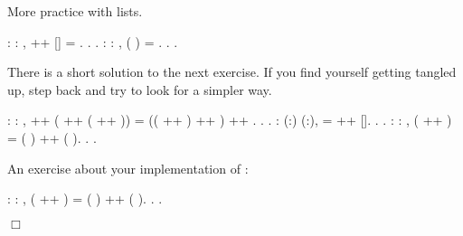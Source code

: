 \documentclass[12pt]{report}
\begin{document}
 More practice with lists. \begin{coqdoccode}
\coqdocemptyline
\coqdocnoindent
{}  : \coqdockw{\ensuremath{\forall}}  : , \coqdoceol
\coqdocindent{1.00em}
 ++ [] = .\coqdoceol
\coqdocnoindent
{}.\coqdoceol
 .\coqdoceol
\coqdocemptyline
\coqdocnoindent
{}  : \coqdockw{\ensuremath{\forall}}  : ,\coqdoceol
\coqdocindent{1.00em}
 ( ) = .\coqdoceol
\coqdocnoindent
{}.\coqdoceol
 .\coqdoceol
\coqdocemptyline
\end{coqdoccode}
There is a short solution to the next exercise.  If you find
    yourself getting tangled up, step back and try to look for a
    simpler way. \begin{coqdoccode}
\coqdocemptyline
\coqdocnoindent
{}  : \coqdockw{\ensuremath{\forall}}     : ,\coqdoceol
\coqdocindent{1.00em}
 ++ ( ++ ( ++ )) = (( ++ ) ++ ) ++ .\coqdoceol
\coqdocnoindent
{}.\coqdoceol
 .\coqdoceol
\coqdocemptyline
\coqdocnoindent
{}  : \coqdockw{\ensuremath{\forall}} (:) (:),\coqdoceol
\coqdocindent{1.00em}
   =  ++ [].\coqdoceol
\coqdocnoindent
{}.\coqdoceol
 .\coqdoceol
\coqdocemptyline
\coqdocnoindent
{}  : \coqdockw{\ensuremath{\forall}}   : ,\coqdoceol
\coqdocindent{1.00em}
 ( ++ ) = ( ) ++ ( ).\coqdoceol
\coqdocnoindent
{}.\coqdoceol
 .\coqdoceol
\coqdocemptyline
\end{coqdoccode}
An exercise about your implementation of : \begin{coqdoccode}
\coqdocemptyline
\coqdocnoindent
{}  : \coqdockw{\ensuremath{\forall}}   : ,\coqdoceol
\coqdocindent{1.00em}
 ( ++ ) = ( ) ++ ( ).\coqdoceol
\coqdocnoindent
{}.\coqdoceol
 .\coqdoceol
\end{coqdoccode}
\ensuremath{\Box} 
\end{document}
